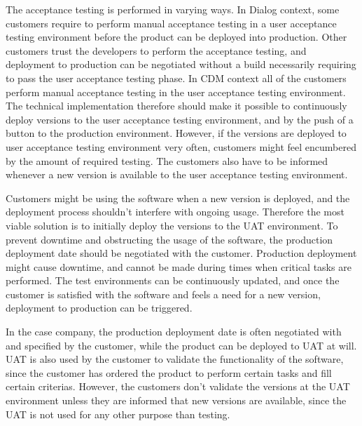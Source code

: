 \documentclass[english]{tktltiki2}
\theoremstyle{definition}
\theoremstyle{remark}
\begin{document}
The acceptance testing is performed in varying ways. In Dialog context, some customers require to perform manual acceptance testing in a user acceptance testing environment before the product can be deployed into production. Other customers trust the developers to perform the acceptance testing, and deployment to production can be negotiated without a build necessarily requiring to pass the user acceptance testing phase. In CDM context all of the customers perform manual acceptance testing in the user acceptance testing environment. The technical implementation therefore should make it possible to continuously deploy versions to the user acceptance testing environment, and by the push of a button to the production environment. However, if the versions are deployed to user acceptance testing environment very often, customers might feel encumbered by the amount of required testing. The customers also have to be informed whenever a new version is available to the user acceptance testing environment.

Customers might be using the software when a new version is deployed, and the deployment process shouldn't interfere with ongoing usage. Therefore the most viable solution is to initially deploy the versions to the UAT environment. To prevent downtime and obstructing the usage of the software, the production deployment date should be negotiated with the customer. Production deployment might cause downtime, and cannot be made during times when critical tasks are performed. The test environments can be continuously updated, and once the customer is satisfied with the software and feels a need for a new version, deployment to production can be triggered.  

In the case company, the production deployment date is often negotiated with and specified by the customer, while the product can be deployed to UAT at will. UAT is also used by the customer to validate the functionality of the software, since the customer has ordered the product to perform certain tasks and fill certain criterias. However, the customers don't validate the versions at the UAT environment unless they are informed that new versions are available, since the UAT is not used for any other purpose than testing. 



\end{document}
